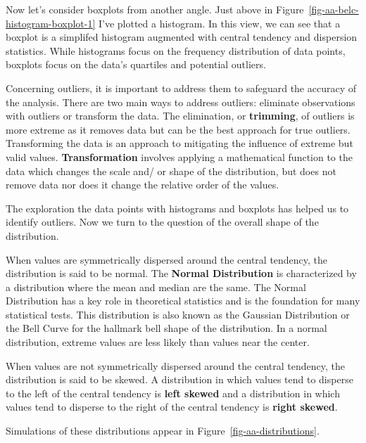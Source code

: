 \documentclass[
  letterpaper,
]{latex/krantz}
\theoremstyle{definition}
\theoremstyle{remark}
\begin{document}
Now let's consider boxplots from another angle. Just above in
Figure~\ref{fig-aa-belc-histogram-boxplot-1} I've plotted a histogram.
In this view, we can see that a boxplot is a simplifed histogram
augmented with central tendency and dispersion statistics. While
histograms focus on the frequency distribution of data points, boxplots
focus on the data's quartiles and potential outliers.

Concerning outliers, it is important to address them to safeguard the
accuracy of the analysis. There are two main ways to address outliers:
eliminate observations with outliers or transform the data. The
elimination, or \textbf{trimming}, of outliers is more extreme as it
removes data but can be the best approach for true outliers.
Transforming the data is an approach to mitigating the influence of
extreme but valid values. \textbf{Transformation} involves applying a
mathematical function to the data which changes the scale and/ or shape
of the distribution, but does not remove data nor does it change the
relative order of the values.

The exploration the data points with histograms and boxplots has helped
us to identify outliers. Now we turn to the question of the overall
shape of the distribution.

When values are symmetrically dispersed around the central tendency, the
distribution is said to be normal. The \textbf{Normal Distribution} is
characterized by a distribution where the mean and median are the same.
The Normal Distribution has a key role in theoretical statistics and is
the foundation for many statistical tests. This distribution is also
known as the Gaussian Distribution or the Bell Curve for the hallmark
bell shape of the distribution. In a normal distribution, extreme values
are less likely than values near the center.

When values are not symmetrically dispersed around the central tendency,
the distribution is said to be skewed. A distribution in which values
tend to disperse to the left of the central tendency is \textbf{left
skewed} and a distribution in which values tend to disperse to the right
of the central tendency is \textbf{right skewed}.

Simulations of these distributions appear in
Figure~\ref{fig-aa-distributions}.
\end{document}
